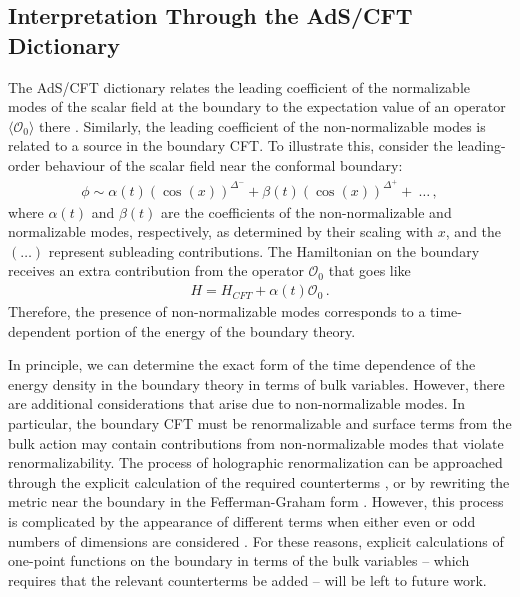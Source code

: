 \documentclass[letterpaper,11pt]{article}
\newcommand{\mc}{\mathcal}
\begin{document}

\subsection{Interpretation Through the AdS/CFT Dictionary}

The AdS/CFT dictionary relates the leading coefficient of the normalizable modes of the scalar field at the boundary to the expectation value of an operator $\langle \mc O_0 \rangle$ there \cite{hep-th/9808017}. Similarly, the leading coefficient of the non-normalizable modes is related to a source in the boundary CFT. To illustrate this, consider the leading-order behaviour of the scalar field near the conformal boundary:  
\begin{align}
	\phi \sim \alpha (t) \left(\cos (x)\right)^{\Delta^-} + \beta (t) \left( \cos (x) \right)^{\Delta^+} +~\ldots \, ,
\end{align}
where $\alpha(t)$ and $\beta(t)$ are the coefficients of the non-normalizable and normalizable modes, respectively, as determined by their scaling with $x$, and the $(\ldots)$ represent subleading contributions. The Hamiltonian on the boundary receives an extra contribution from the operator $\mc O_0$ that goes like
\begin{align}
	H = H_{CFT} + \alpha(t) \mc O_0 \, .
\end{align}
Therefore, the presence of non-normalizable modes corresponds to a time-dependent portion of the energy of the boundary theory. 

In principle, we can determine the exact form of the time dependence of the energy density in the boundary theory in terms of bulk variables. However, there are additional considerations that arise due to non-normalizable modes. In particular, the boundary CFT must be renormalizable and surface terms from the bulk action may contain contributions from non-normalizable modes that violate renormalizability. The process of holographic renormalization can be approached through the explicit calculation of the required counterterms \cite{hep-th/9804058, hep-th/0112119}, or by rewriting the metric near the boundary in the Fefferman-Graham form \cite{0707.1737, hep-th/0303164, hep-th/0205075, fefferman1985mathematical}. However, this process is complicated by the appearance of different terms when either even or odd numbers of dimensions are considered \cite{hep-th/0205061, 1206.6785}. For these reasons, explicit calculations of one-point functions on the boundary in terms of the bulk variables -- which requires that the relevant counterterms be added -- will be left to future work.
\end{document}
